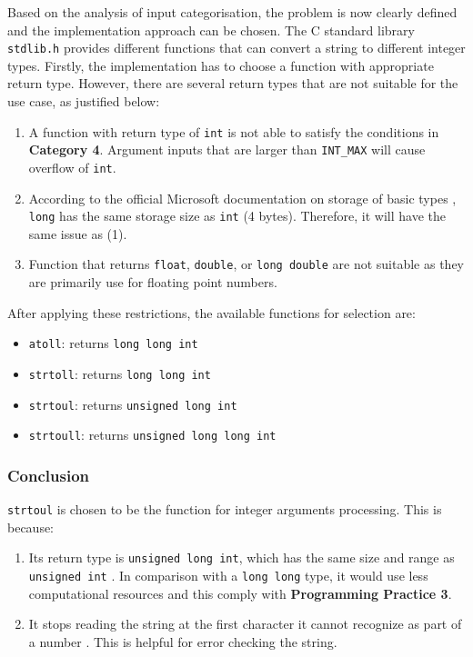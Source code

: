 \documentclass[12pt, a4paper]{article}
\begin{document}
Based on the analysis of input categorisation, the problem is now clearly defined and the
implementation approach can be chosen. The C standard library \texttt{stdlib.h} provides
different functions that can convert a string to different integer types. Firstly, the
implementation has to choose a function with appropriate return type. However, there are several
return types that are not suitable for the use case, as justified below:
\begin{enumerate}
  \item A function with return type of \texttt{int} is not able to satisfy the conditions in
  \textbf{Category 4}. Argument inputs that are larger than \texttt{INT_MAX} will cause
  overflow of \texttt{int}.

  \item According to the official Microsoft documentation on storage of basic types
  \cite{basic_types_storage}, \texttt{long} has the same storage size as \texttt{int}
  (4 bytes). Therefore, it will have the same issue as (1).

  \item Function that returns \texttt{float}, \texttt{double}, or \texttt{long
  double} are not suitable as they are primarily use for floating point numbers.
\end{enumerate}

After applying these restrictions, the available functions for selection are:
\begin{itemize}
  \item \texttt{atoll}: returns \texttt{long long int}
  \item \texttt{strtoll}: returns \texttt{long long int}
  \item \texttt{strtoul}: returns \texttt{unsigned long int}
  \item \texttt{strtoull}: returns \texttt{unsigned long long int}
\end{itemize}

\subsubsection*{Conclusion}
\texttt{strtoul} is chosen to be the function for integer arguments processing. This is
because:
\begin{enumerate}
  \item Its return type is \texttt{unsigned long int}, which has the same size and range as
  \texttt{unsigned int} \cite{basic_types_storage}. In comparison with a \texttt{long
  long} type, it would use less computational resources and this comply with \textbf{Programming
  Practice 3}.
  \item It stops reading the string at the first character it cannot recognize as part of a number
  \cite{strtoul}. This is helpful for error checking the string.
\end{enumerate}
\end{document}
